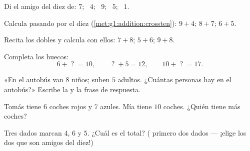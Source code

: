 \begin{exercise}[$\star$]\label{exo:g1:addition:3}
Di el amigo del diez de: $7$; \ $4$; \ $9$; \ $5$; \ $1$.
\end{exercise}

\begin{exercise}[$\star$]\label{exo:g1:addition:4}
Calcula pasando por el diez (\cref{met:g1:addition:crossten}):
$9 + 4$; \quad $8 + 7$; \quad $6 + 5$.
\end{exercise}

\begin{exercise}[$\star$]\label{exo:g1:addition:5}
Recita los dobles y calcula con ellos: $7 + 8$; \quad
$5 + 6$; \quad $9 + 8$.
\end{exercise}

\begin{exercise}[$\star$]\label{exo:g1:addition:6}
Completa los huecos:
\[
6 + \;?\; = 10, \qquad
\;?\; + 5 = 12, \qquad
10 + \;?\; = 17 .
\]
\end{exercise}

\begin{exercise}[$\star$]\label{exo:g1:addition:7}
«En el autobús van $8$ niños; suben $5$ adultos. ¿Cuántas
personas hay en el autobús?» Escribe la  y la frase de
respuesta.
\end{exercise}

\begin{exercise}[$\star$]\label{exo:g1:addition:8}
Tomás tiene $6$ coches rojos y $7$ azules. Mía tiene $10$ coches. ¿Quién
tiene más coches?
\end{exercise}

\begin{exercise}[$\star\star$]\label{exo:g1:addition:9}
Tres dados marcan $4$, $6$ y $5$. ¿Cuál es el total? ( primero dos
dados --- ¡elige los dos que son amigos del diez!)
\end{exercise}
